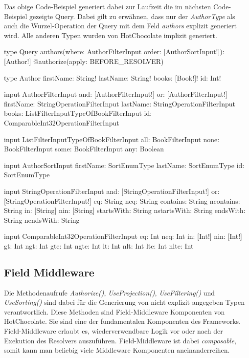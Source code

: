 Das obige Code-Beispiel generiert dabei zur Laufzeit die im nächsten Code-Beispiel gezeigte Query.
Dabei gilt zu erwähnen, dass nur der \textit{AuthorType} als auch die Wurzel-Operation der Query mit dem Feld \textit{authors} explizit generiert wird.
Alle anderen Typen wurden von HotChocolate implizit generiert.

\begin{JsCode}
type Query{
    authors(where: AuthorFilterInput order: [AuthorSortInput!]): [Author!] @authorize(apply: BEFORE_RESOLVER)
}

type Author {
    firstName: String!
    lastName: String!
    books: [Book!]!
    id: Int!
}

input AuthorFilterInput {
    and: [AuthorFilterInput!]
    or: [AuthorFilterInput!]
    firstName: StringOperationFilterInput
    lastName: StringOperationFilterInput
    books: ListFilterInputTypeOfBookFilterInput
    id: ComparableInt32OperationFilterInput
}

input ListFilterInputTypeOfBookFilterInput {
  all: BookFilterInput
  none: BookFilterInput
  some: BookFilterInput
  any: Boolean
}

input AuthorSortInput {
    firstName: SortEnumType
    lastName: SortEnumType
    id: SortEnumType
}

input StringOperationFilterInput {
  and: [StringOperationFilterInput!]
  or: [StringOperationFilterInput!]
  eq: String
  neq: String
  contains: String
  ncontains: String
  in: [String]
  nin: [String]
  startsWith: String
  nstartsWith: String
  endsWith: String
  nendsWith: String
}

input ComparableInt32OperationFilterInput {
    eq: Int
    neq: Int
    in: [Int!]
    nin: [Int!]
    gt: Int
    ngt: Int
    gte: Int
    ngte: Int
    lt: Int
    nlt: Int
    lte: Int
    nlte: Int
}
\end{JsCode}

\subsection{Field Middleware}
Die Methodenaufrufe \textit{Authorize()}, \textit{UseProjection()}, \textit{UseFiltering()} und \textit{UseSorting()} sind dabei für die Generierung von nicht explizit angegeben Typen verantwortlich.
Diese Methoden sind Field-Middleware Komponenten von HotChocolate.
Sie sind eine der fundamentalen Komponenten des Frameworks.
Field-Middleware erlaubt es, wiederverwendbare Logik vor oder nach der Exekution des Resolvers auszuführen.
Field-Middleware ist dabei \textit{composable}, somit kann man beliebig viele Middleware Komponenten aneinanderreihen.

